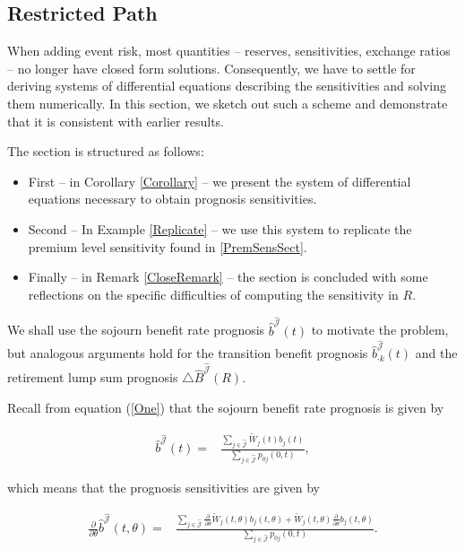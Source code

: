 \documentclass{article}
\newcommand{\1}[1]{\mathbbm{1}_{\left\lbrace #1 \right\rbrace}}
\theoremstyle{break}
\theoremstyle{remark}
\numberwithin{equation}{section}
\begin{document}
\subsection{Restricted Path} \label{SensRestr}

When adding event risk, most quantities -- reserves, sensitivities, exchange ratios -- no longer have closed form solutions. Consequently, we have to settle for deriving systems of differential equations describing the sensitivities and solving them numerically. In this section, we sketch out such a scheme and demonstrate that it is consistent with earlier results.

The section is structured as follows:

\begin{itemize}
	\item First -- in Corollary \ref{Corollary} -- we present the system of differential equations necessary to obtain prognosis sensitivities.
	\item Second -- In Example \ref{Replicate} -- we use this system to replicate the premium level sensitivity found in \ref{PremSensSect}.
	\item Finally -- in Remark \ref{CloseRemark} -- the section is concluded with some reflections on the specific difficulties of computing the sensitivity in $R$.
\end{itemize}

We shall use the sojourn benefit rate prognosis $\hat{b}^{\hat{\mathcal{J}}}(t)$ to motivate the problem, but analogous arguments hold for the transition benefit prognosis $\hat{b}^{\hat{\mathcal{J}}}_{\cdot k}(t)$ and the retirement lump sum prognosis $\triangle \hat{B}^{\hat{\mathcal{J}}}(R)$.

Recall from equation (\ref{One}) that the sojourn benefit rate prognosis is given by

\begin{align*}
	 \hat{b}^{\hat{\mathcal{J}}}(t) =&\frac{\sum_{j \in \hat{\mathcal{J}}} \tilde{W}_j(t) b_j(t)}{\sum_{j \in \hat{\mathcal{J}}} p_{0j}(0,t)},
\end{align*}

which means that the prognosis sensitivities are given by

\begin{align*}
	\frac{\partial}{\partial \theta} \hat{b}^{\hat{\mathcal{J}}}(t,\theta) =&\frac{\sum_{j \in \hat{\mathcal{J}}} \frac{\partial}{\partial \theta} \tilde{W}_j(t,\theta) b_j(t,\theta) +\tilde{W}_j(t,\theta) \frac{\partial}{\partial \theta} b_j(t,\theta)}{\sum_{j \in \hat{\mathcal{J}}} p_{0j}(0,t)}.
\end{align*}
\end{document}
